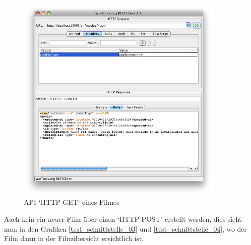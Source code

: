 \begin{figure}[ht]
    \begin{center}
        \includegraphics[width=0.9\textwidth,angle=0]{./bilder/tests/test_schnittstelle_02.png}
        \caption{API `HTTP GET' eines Filmes}
        \label{test_schnittstelle_02}
    \end{center}
\end{figure}

\clearpage

Auch kein ein neuer Film über einen `HTTP POST' erstellt werden, dies sieht man
in den Grafiken \ref{test_schnittstelle_03} und \ref{test_schnittstelle_04},
wo der Film dann in der Filmübersicht ersichtlich ist.

